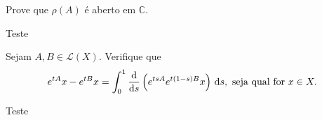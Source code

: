 \begin{Mybox}
Prove que $\rho(A)$ é aberto em $\mathbb{C}$.
\end{Mybox}
\vspace{-.5cm}
\begin{dem}
Teste
\end{dem}
\begin{Mybox}
Sejam $A, B \in \mathcal{L}(X)$. Verifique que
\[
e^{tA} x - e^{tB} x = \int_0^1 \frac{\mathrm{d} }{\mathrm{d} s} \left( e^{tsA} e^{t(1-s)B}x \right) \, \mathrm{d} s, \text{ seja qual for } x \in X.
\]
\end{Mybox}
\vspace{-.5cm}
\begin{dem}
Teste
\end{dem}




